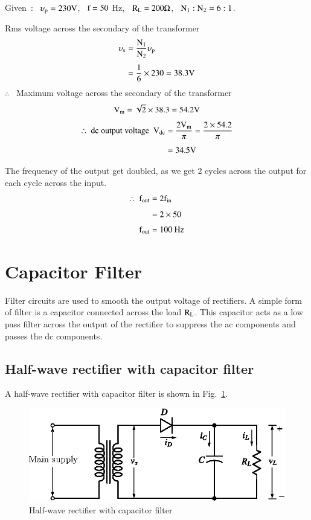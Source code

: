 \begin{solution}
Given~:~ $\upsilon_{\textrm{p}}=230\textrm{V}$, \ $\textrm{f}=50$ Hz, \ $\textrm{R}_{\textrm{L}}=200\Omega$, \ $\textrm{N}_{1}:\textrm{N}_{2}=6:1$.

Rms voltage across the secondary of the transformer
\begin{align*}
\upsilon_{\textrm{s}} &= \frac{\textrm{N}_{1}}{\textrm{N}_{2}}\upsilon_{\textrm{p}}\\[4pt]
&= \frac{1}{6}\times 230=38.3\textrm{V}
\end{align*}
$\therefore$~ Maximum voltage across the secondary of the transformer
$$
\textrm{V}_{\textrm{m}}=\sqrt{2}\times 38.3=54.2\textrm{V}
$$
\begin{align*}
\therefore \ \text{dc output voltage~ } \textrm{V}_{\text{dc}} &= \frac{2\textrm{V}_{\textrm{m}}}{\pi}=\frac{2\times 54.2}{\pi}\\[4pt]
&= 34.5\textrm{V}
\end{align*}

The frequency of the output get doubled, as we get 2 cycles across the output for each cycle across the input.
\begin{align*}
\therefore \ \textrm{f}_{\text{out}} &= 2\textrm{f}_{\text{in}}\\[4pt]
 &= 2\times 50\\[3pt]
\textrm{f}_{\text{out}} &= 100\text{~Hz}
\end{align*}
\end{solution}

\section{Capacitor Filter}\label{sec1.11}

Filter circuits are used to smooth the output voltage of rectifiers. A simple form of filter is a capacitor connected across the load $\textrm{R}_{\textrm{L}}$. This capacitor acts as a low pass filter across the output of the rectifier to suppress the ac components and passes the dc components.

\subsection{Half-wave rectifier with capacitor filter}\label{sec1.11.1}

A half-wave rectifier with capacitor filter is shown in Fig.~\ref{fig1.37}.
\begin{figure}[H]
\centering
\includegraphics{chap1/fig1.37.eps}
\caption{Half-wave rectifier with capacitor filter}\label{fig1.37}
\end{figure}

